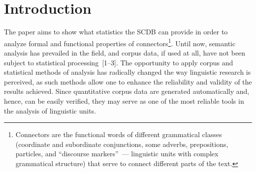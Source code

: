 


\vspace*{-4pt}



      \thispagestyle{myheadings}

      \begin{multicols}{2}

                  \label{st\stat}

\section{Introduction}

  \noindent
  The paper aims to show what statistics the SCDB can 
provide in order to analyze formal and functional properties of 
connectors\footnote[3]{Connectors are the functional words of 
different grammatical classes (coordinate 
and subordinate conjunctions, some adverbs, prepositions, particles,
 and ``discourse markers''~--- 
linguistic units with complex grammatical structure) that serve 
to connect different parts of the text.}. 
Until now, semantic analysis has prevailed in the field, and corpus data, if used 
at all, have not been subject to statistical processing~[1--3]. The opportunity 
to apply corpus and statistical methods of analysis has radically changed the way 
linguistic research is perceived, as such methods allow one to enhance the 
reliability and validity of the results achieved. Since quantitative corpus data are 
generated automatically and, hence, can be easily verified, they may serve as one of 
the most reliable tools in the analysis of linguistic units.
  

\end{multicols}
